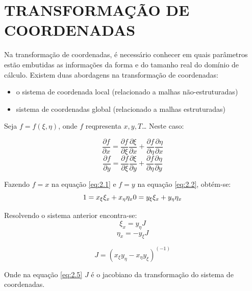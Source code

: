 \chapter[TRANSFORMAÇÃO DE COORDENADAS]{TRANSFORMAÇÃO DE COORDENADAS}

Na transformação de coordenadas, é necessário conhecer em quais parâmetros estão embutidas as informações da forma e do tamanho real do domínio de cálculo. Existem duas abordagens na transformação de coordenadas:
\begin{itemize}
    \item o sistema de coordenada local (relacionado a malhas não-estruturadas)
    \item sistema de coordenadas global (relacionado a malhas estruturadas)
\end{itemize}

Seja $f=f(\xi, \eta)$, onde $f$ reqpresenta $x,y,T$\dots
Neste caso:

\begin{equation}
    \frac{\partial f}{\partial x} = \frac{\partial f}{\partial \xi}\frac{\partial \xi}{\partial x}+\frac{\partial f}{\partial \eta}\frac{\partial \eta}{\partial x}
    \label{eq:2.1}
\end{equation}
\begin{equation}
    \frac{\partial f}{\partial y} = \frac{\partial f}{\partial \xi}\frac{\partial \xi}{\partial y}+\frac{\partial f}{\partial \eta}\frac{\partial \eta}{\partial y}
    \label{eq:2.2}
\end{equation}

Fazendo $f=x$ na equação \ref{eq:2.1} e $f=y$ na equação \ref{eq:2.2}, obtém-se:
\begin{equation*}
    1 = x_\xi \xi_x + x_\eta \eta_x\\
    0 = y_\xi \xi_x + y_\eta \eta_x
\end{equation*}

Resolvendo o sistema anterior encontra-se:
\begin{equation}
    \label{eq:2.3}
    \xi_x = y_\eta J
\end{equation}
\begin{equation}
    \label{eq:2.4}
    \eta_x = -y_\xi J
\end{equation}

\begin{equation}
    J = (x_\xi y_\eta - x_\eta y_\xi)^(-1)
    \label{eq:2.5}
\end{equation}

Onde na equação \ref{eq:2.5} $J$  é o jacobiano da transformação do sistema de coordenadas.


